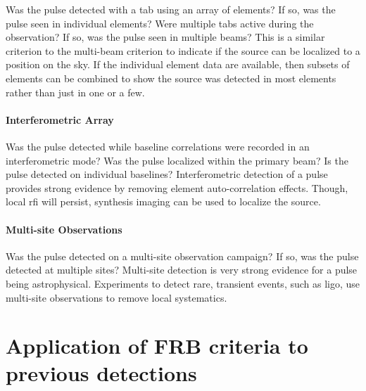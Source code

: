 \documentclass[a4paper,fleqn,usenatbib]{mnras}
\begin{document}
Was the pulse detected with a \gls{tab} using an array of elements? If so, was
the pulse seen in individual elements? Were multiple \glspl{tab} active during
the observation? If so, was the pulse seen in multiple beams? This is a similar
criterion to the multi-beam criterion to indicate if the source can be localized
to a position on the sky. If the individual element data are available, then
subsets of elements can be combined to show the source was detected in most
elements rather than just in one or a few.

\paragraph{Interferometric Array}

Was the pulse detected while baseline correlations were recorded in an
interferometric mode? Was the pulse localized within the primary beam? Is the
pulse detected on individual baselines? Interferometric detection of a pulse
provides strong evidence by removing element auto-correlation effects. Though,
local \gls{rfi} will persist, synthesis imaging can be used to localize the
source.

\paragraph{Multi-site Observations}

Was the pulse detected on a multi-site observation campaign? If so, was the
pulse detected at multiple sites? Multi-site detection is very strong evidence
for a pulse being astrophysical. Experiments to detect rare, transient events,
such as \gls{ligo}, use multi-site observations to remove local systematics.

\section{Application of FRB criteria to previous detections}
\label{sec:appln_to_previous_detections}
\end{document}
